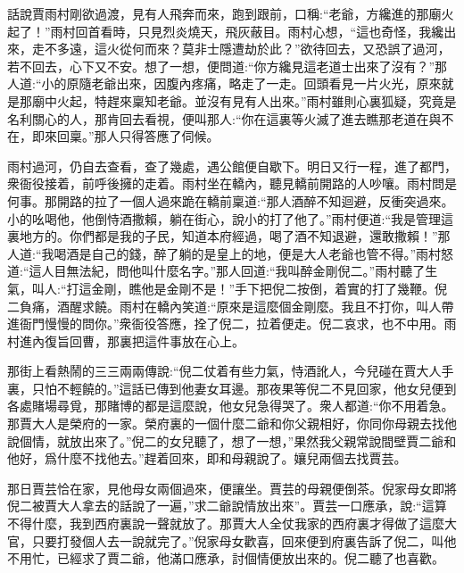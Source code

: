 


\begin{parag}
    話說賈雨村剛欲過渡，見有人飛奔而來，跑到跟前，口稱:“老爺，方纔進的那廟火起了！”雨村回首看時，只見烈炎燒天，飛灰蔽目。雨村心想，“這也奇怪，我纔出來，走不多遠，這火從何而來？莫非士隱遭劫於此？”欲待回去，又恐誤了過河，若不回去，心下又不安。想了一想，便問道:“你方纔見這老道士出來了沒有？”那人道:“小的原隨老爺出來，因腹內疼痛，略走了一走。回頭看見一片火光，原來就是那廟中火起，特趕來稟知老爺。並沒有見有人出來。”雨村雖則心裏狐疑，究竟是名利關心的人，那肯回去看視，便叫那人:“你在這裏等火滅了進去瞧那老道在與不在，即來回稟。”那人只得答應了伺候。
\end{parag}


\begin{parag}
    雨村過河，仍自去查看，查了幾處，遇公館便自歇下。明日又行一程，進了都門，衆衙役接着，前呼後擁的走着。雨村坐在轎內，聽見轎前開路的人吵嚷。雨村問是何事。那開路的拉了一個人過來跪在轎前稟道:“那人酒醉不知迴避，反衝突過來。小的吆喝他，他倒恃酒撒賴，躺在街心，說小的打了他了。”雨村便道:“我是管理這裏地方的。你們都是我的子民，知道本府經過，喝了酒不知退避，還敢撒賴！”那人道:“我喝酒是自己的錢，醉了躺的是皇上的地，便是大人老爺也管不得。”雨村怒道:“這人目無法紀，問他叫什麼名字。”那人回道:“我叫醉金剛倪二。”雨村聽了生氣，叫人:“打這金剛，瞧他是金剛不是！”手下把倪二按倒，着實的打了幾鞭。倪二負痛，酒醒求饒。雨村在轎內笑道:“原來是這麼個金剛麼。我且不打你，叫人帶進衙門慢慢的問你。”衆衙役答應，拴了倪二，拉着便走。倪二哀求，也不中用。雨村進內復旨回曹，那裏把這件事放在心上。
\end{parag}


\begin{parag}
    那街上看熱鬧的三三兩兩傳說:“倪二仗着有些力氣，恃酒訛人，今兒碰在賈大人手裏，只怕不輕饒的。”這話已傳到他妻女耳邊。那夜果等倪二不見回家，他女兒便到各處賭場尋覓，那賭博的都是這麼說，他女兒急得哭了。衆人都道:“你不用着急。那賈大人是榮府的一家。榮府裏的一個什麼二爺和你父親相好，你同你母親去找他說個情，就放出來了。”倪二的女兒聽了，想了一想，”果然我父親常說間壁賈二爺和他好，爲什麼不找他去。”趕着回來，即和母親說了。孃兒兩個去找賈芸。
\end{parag}


\begin{parag}
    那日賈芸恰在家，見他母女兩個過來，便讓坐。賈芸的母親便倒茶。倪家母女即將倪二被賈大人拿去的話說了一遍，”求二爺說情放出來”。賈芸一口應承，說:“這算不得什麼，我到西府裏說一聲就放了。那賈大人全仗我家的西府裏才得做了這麼大官，只要打發個人去一說就完了。”倪家母女歡喜，回來便到府裏告訴了倪二，叫他不用忙，已經求了賈二爺，他滿口應承，討個情便放出來的。倪二聽了也喜歡。
\end{parag}


